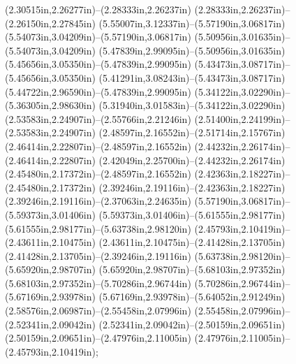 (2.30515in,2.26277in)--(2.28333in,2.26237in) (2.28333in,2.26237in)--(2.26150in,2.27845in) (5.55007in,3.12337in)--(5.57190in,3.06817in) (5.54073in,3.04209in)--(5.57190in,3.06817in) (5.50956in,3.01635in)--(5.54073in,3.04209in) (5.47839in,2.99095in)--(5.50956in,3.01635in) (5.45656in,3.05350in)--(5.47839in,2.99095in) (5.43473in,3.08717in)--(5.45656in,3.05350in) (5.41291in,3.08243in)--(5.43473in,3.08717in) (5.44722in,2.96590in)--(5.47839in,2.99095in) (5.34122in,3.02290in)--(5.36305in,2.98630in) (5.31940in,3.01583in)--(5.34122in,3.02290in) (2.53583in,2.24907in)--(2.55766in,2.21246in) (2.51400in,2.24199in)--(2.53583in,2.24907in) (2.48597in,2.16552in)--(2.51714in,2.15767in) (2.46414in,2.22807in)--(2.48597in,2.16552in) (2.44232in,2.26174in)--(2.46414in,2.22807in) (2.42049in,2.25700in)--(2.44232in,2.26174in) (2.45480in,2.17372in)--(2.48597in,2.16552in) (2.42363in,2.18227in)--(2.45480in,2.17372in) (2.39246in,2.19116in)--(2.42363in,2.18227in) (2.39246in,2.19116in)--(2.37063in,2.24635in) (5.57190in,3.06817in)--(5.59373in,3.01406in) (5.59373in,3.01406in)--(5.61555in,2.98177in) (5.61555in,2.98177in)--(5.63738in,2.98120in) (2.45793in,2.10419in)--(2.43611in,2.10475in) (2.43611in,2.10475in)--(2.41428in,2.13705in) (2.41428in,2.13705in)--(2.39246in,2.19116in) (5.63738in,2.98120in)--(5.65920in,2.98707in) (5.65920in,2.98707in)--(5.68103in,2.97352in) (5.68103in,2.97352in)--(5.70286in,2.96744in) (5.70286in,2.96744in)--(5.67169in,2.93978in) (5.67169in,2.93978in)--(5.64052in,2.91249in) (2.58576in,2.06987in)--(2.55458in,2.07996in) (2.55458in,2.07996in)--(2.52341in,2.09042in) (2.52341in,2.09042in)--(2.50159in,2.09651in) (2.50159in,2.09651in)--(2.47976in,2.11005in) (2.47976in,2.11005in)--(2.45793in,2.10419in);
